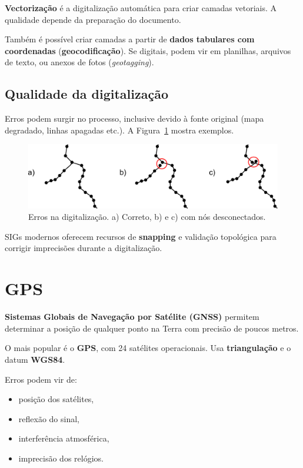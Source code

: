 \textbf{Vectorização} é a digitalização automática para criar camadas vetoriais. A qualidade depende da preparação do documento.

Também é possível criar camadas a partir de \textbf{dados tabulares com coordenadas} (\textbf{geocodificação}). Se digitais, podem vir em planilhas, arquivos de texto, ou anexos de fotos (\emph{geotagging}).

\subsection{Qualidade da digitalização}

Erros podem surgir no processo, inclusive devido à fonte original (mapa degradado, linhas apagadas etc.). A Figura~\ref{Fig:Imprecisiones_digitalizacion} mostra exemplos.

\begin{figure}[!hbt]   
\centering
\includegraphics[width=\textwidth]{Fontes_dados/Imprecisiones_digitalizacion.pdf}
\caption{\small Erros na digitalização. a) Correto, b) e c) com nós desconectados.}
\label{Fig:Imprecisiones_digitalizacion} 
\end{figure}

SIGs modernos oferecem recursos de \textbf{snapping} e validação topológica para corrigir imprecisões durante a digitalização.

\section{GPS}

\textbf{Sistemas Globais de Navegação por Satélite (GNSS)} permitem determinar a posição de qualquer ponto na Terra com precisão de poucos metros.

O mais popular é o \textbf{GPS}, com 24 satélites operacionais. Usa \textbf{triangulação} e o datum \textbf{WGS84}.

Erros podem vir de:
\begin{itemize}
\item posição dos satélites,
\item reflexão do sinal,
\item interferência atmosférica,
\item imprecisão dos relógios.
\end{itemize}

